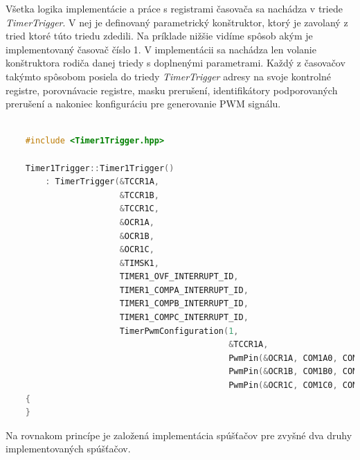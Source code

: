 Všetka logika implementácie a práce s registrami časovača sa nachádza v triede \textit{TimerTrigger}. V nej je definovaný parametrický konštruktor, ktorý
je zavolaný z tried ktoré túto triedu zdedili. Na príklade nižšie vidíme spôsob akým je implementovaný časovač číslo 1. V implementácii sa nachádza len volanie
konštruktora rodiča danej triedy s doplnenými parametrami. Každý z časovačov takýmto spôsobom posiela do triedy \textit{TimerTrigger} adresy na svoje
kontrolné registre, porovnávacie registre, masku prerušení, identifikátory podporovaných prerušení a nakoniec konfiguráciu pre generovanie PWM signálu.

\begin{lstlisting}[language=c++]  

    #include <Timer1Trigger.hpp>

    Timer1Trigger::Timer1Trigger()
        : TimerTrigger(&TCCR1A,
                       &TCCR1B,
                       &TCCR1C,
                       &OCR1A,
                       &OCR1B,
                       &OCR1C,
                       &TIMSK1,
                       TIMER1_OVF_INTERRUPT_ID,
                       TIMER1_COMPA_INTERRUPT_ID,
                       TIMER1_COMPB_INTERRUPT_ID,
                       TIMER1_COMPC_INTERRUPT_ID,
                       TimerPwmConfiguration(1,
                                             &TCCR1A,
                                             PwmPin(&OCR1A, COM1A0, COM1A1),
                                             PwmPin(&OCR1B, COM1B0, COM1B1),
                                             PwmPin(&OCR1C, COM1C0, COM1C1)))
    {
    }
\end{lstlisting}

Na rovnakom princípe je založená implementácia spúšťačov pre zvyšné dva druhy implementovaných spúšťačov.